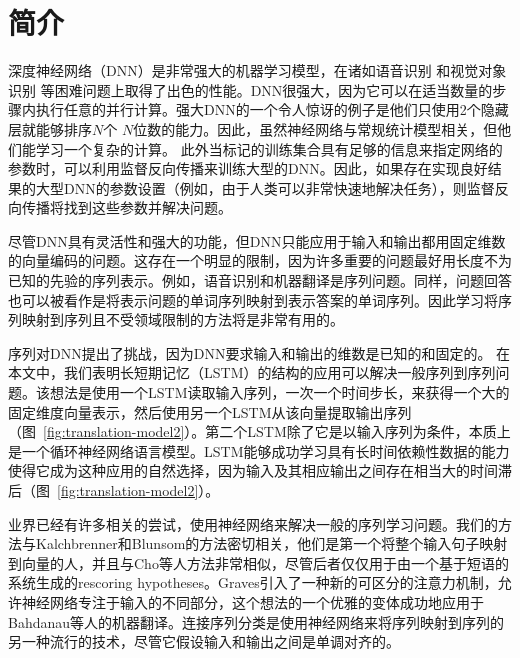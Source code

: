 \section{简介}

深度神经网络（DNN）是非常强大的机器学习模型，在诸如语音识别 \cite{hinton12,dahl12b} 和视觉对象识别 \cite{kriz12,ciresan12,lecun98,le12} 等困难问题上取得了出色的性能。DNN很强大，因为它可以在适当数量的步骤内执行任意的并行计算。强大DNN的一个令人惊讶的例子是他们只使用2个隐藏层就能够排序$N$个 \!\!\!\!\quad $N$位数的能力\cite{razborov}。因此，虽然神经网络与常规统计模型相关，但他们能学习一个复杂的计算。
此外当标记的训练集合具有足够的信息来指定网络的参数时，可以利用监督反向传播来训练大型的DNN。因此，如果存在实现良好结果的大型DNN的参数设置（例如，由于人类可以非常快速地解决任务），则监督反向传播将找到这些参数并解决问题。

尽管DNN具有灵活性和强大的功能，但DNN只能应用于输入和输出都用固定维数的向量编码的问题。这存在一个明显的限制，因为许多重要的问题最好用长度不为已知的先验的序列表示。例如，语音识别和机器翻译是序列问题。同样，问题回答也可以被看作是将表示问题的单词序列映射到表示答案的单词序列。因此学习将序列映射到序列且不受领域限制的方法将是非常有用的。

序列对DNN提出了挑战，因为DNN要求输入和输出的维数是已知的和固定的。
在本文中，我们表明长短期记忆（LSTM）的结构\cite{hochreiter97}的应用可以解决一般序列到序列问题。该想法是使用一个LSTM读取输入序列，一次一个时间步长，来获得一个大的固定维度向量表示，然后使用另一个LSTM从该向量提取输出序列（图~\ref{fig:translation-model2}）。第二个LSTM除了它是以输入序列为条件，本质上是一个循环神经网络语言模型\cite{rumelhart1986learning,mikolov2010recurrent,sundermeyer12}。LSTM能够成功学习具有长时间依赖性数据的能力使得它成为这种应用的自然选择，因为输入及其相应输出之间存在相当大的时间滞后（图~\ref{fig:translation-model2}）。

业界已经有许多相关的尝试，使用神经网络来解决一般的序列学习问题。我们的方法与Kalchbrenner和Blunsom\cite{kal13}的方法密切相关，他们是第一个将整个输入句子映射到向量的人，并且与Cho等人\cite{cho14}方法非常相似，尽管后者仅仅用于由一个基于短语的系统生成的rescoring hypotheses。Graves\cite{graves13c}引入了一种新的可区分的注意力机制，允许神经网络专注于输入的不同部分，这个想法的一个优雅的变体成功地应用于Bahdanau等人\cite{bog14}的机器翻译。连接序列分类是使用神经网络来将序列映射到序列的另一种流行的技术，尽管它假设输入和输出之间是单调对齐的\cite{graves1}。


